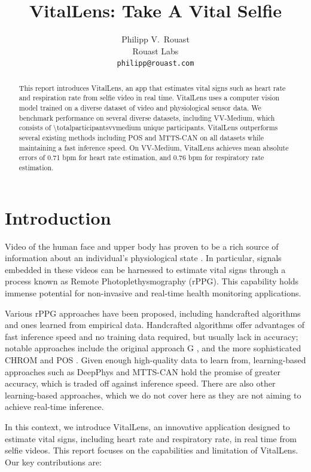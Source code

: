 \documentclass{article}
\title{VitalLens: Take A Vital Selfie}
\author{%
  Philipp V.~Rouast \\
  Rouast Labs\\
  \texttt{philipp@rouast.com} \\
}
\begin{document}
\maketitle


\begin{abstract}
This report introduces VitalLens, an app that estimates vital signs such as heart rate and respiration rate from selfie video in real time.
VitalLens uses a computer vision model trained on a diverse dataset of video and physiological sensor data.
We benchmark performance on several diverse datasets, including VV-Medium, which consists of \num{\totalparticipantsvvmedium} unique participants.
VitalLens outperforms several existing methods including POS and MTTS-CAN on all datasets while maintaining a fast inference speed.
On VV-Medium, VitalLens achieves mean absolute errors of 0.71 bpm for heart rate estimation, and 0.76 bpm for respiratory rate estimation.
\end{abstract}


\section{Introduction}
\label{sec:introduction}

Video of the human face and upper body has proven to be a rich source of information about an individual's physiological state \cite{verkruysse2008remote}.
In particular, signals embedded in these videos can be harnessed to estimate vital signs through a process known as Remote Photoplethysmography (rPPG).
This capability holds immense potential for non-invasive and real-time health monitoring applications.

Various rPPG approaches have been proposed, including handcrafted algorithms and ones learned from empirical data.
Handcrafted algorithms offer advantages of fast inference speed and no training data required, but usually lack in accuracy; notable approaches include the original approach G \cite{verkruysse2008remote}, and the more sophisticated CHROM \cite{de2013robust} and POS \cite{wang2017algorithmic}.
Given enough high-quality data to learn from, learning-based approaches such as DeepPhys \cite{chen2018deep} and MTTS-CAN \cite{liu2020multi} hold the promise of greater accuracy, which is traded off against inference speed.
There are also other learning-based approaches, which we do not cover here as they are not aiming to achieve real-time inference.

In this context, we introduce VitalLens, an innovative application designed to estimate vital signs, including heart rate and respiratory rate, in real time from selfie videos.
This report focuses on the capabilities and limitation of VitalLens.
Our key contributions are:
\end{document}
